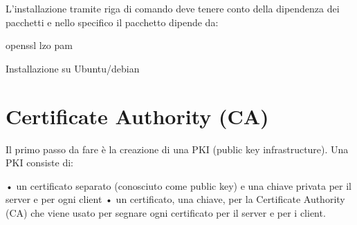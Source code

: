 

L'installazione tramite riga di comando deve tenere conto della dipendenza dei pacchetti e nello specifico il pacchetto dipende da:

\textasteriskcentered openssl
\textasteriskcentered lzo
\textasteriskcentered pam

Installazione su Ubuntu/debian

\section{Certificate Authority (CA)}

Il primo passo da fare è la creazione di una PKI (public key infrastructure).
 Una PKI consiste di:

• un certificato separato (conosciuto come public key) e una chiave privata per il server e per ogni client
• un certificato, una chiave,  per la Certificate Authority (CA) che viene usato per segnare ogni certificato per il server e per i client.
